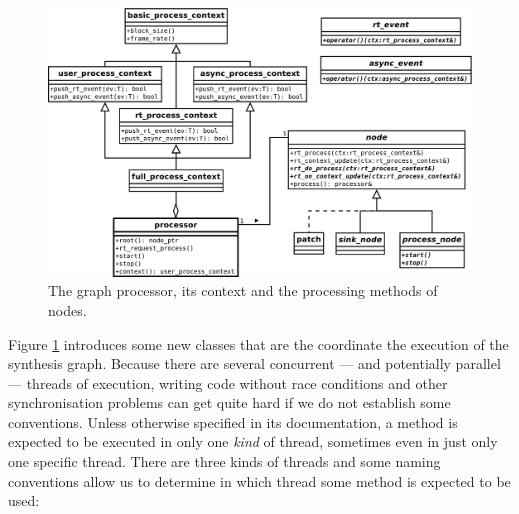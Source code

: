 \begin{figure}[h]
  \centering
  \includegraphics[width=\textwidth]{pic/graph-processor.pdf}
  \caption{The graph processor, its context and the processing methods
    of nodes. }
  \label{fig:graphprocess}
\end{figure}

Figure \ref{fig:graphprocess} introduces some new classes that are the
coordinate the execution of the synthesis graph. Because there are
several concurrent --- and potentially parallel --- threads of
execution, writing code without race conditions and other
synchronisation problems can get quite hard if we do not establish
some conventions. Unless otherwise specified in its documentation, a
method is expected to be executed in only one \emph{kind} of thread,
sometimes even in just only one specific thread. There are three kinds
of threads and some naming conventions allow us to determine in which
thread some method is expected to be used:

